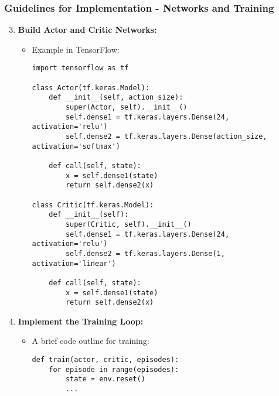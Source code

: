 \documentclass{beamer}
\begin{document}
\begin{frame}[fragile]
    \frametitle{Guidelines for Implementation - Networks and Training}
    \begin{enumerate}
        \setcounter{enumi}{2}
        \item \textbf{Build Actor and Critic Networks:}
        \begin{itemize}
            \item Example in TensorFlow:
            \begin{lstlisting}
import tensorflow as tf

class Actor(tf.keras.Model):
    def __init__(self, action_size):
        super(Actor, self).__init__()
        self.dense1 = tf.keras.layers.Dense(24, activation='relu')
        self.dense2 = tf.keras.layers.Dense(action_size, activation='softmax')

    def call(self, state):
        x = self.dense1(state)
        return self.dense2(x)

class Critic(tf.keras.Model):
    def __init__(self):
        super(Critic, self).__init__()
        self.dense1 = tf.keras.layers.Dense(24, activation='relu')
        self.dense2 = tf.keras.layers.Dense(1, activation='linear')

    def call(self, state):
        x = self.dense1(state)
        return self.dense2(x)
            \end{lstlisting}
        \end{itemize}

        \item \textbf{Implement the Training Loop:}
        \begin{itemize}
            \item A brief code outline for training:
            \begin{lstlisting}
def train(actor, critic, episodes):
    for episode in range(episodes):
        state = env.reset()
        ...
            \end{lstlisting}
        \end{itemize}
    \end{enumerate}
\end{frame}
\end{document}

